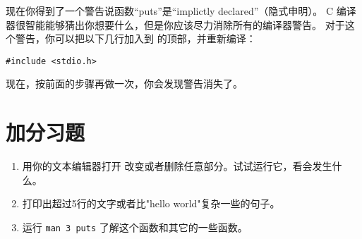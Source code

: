 现在你得到了一个警告说函数“puts”是“implictly declared”（隐式申明）。
C 编译器很智能能够猜出你想要什么，但是你应该尽力消除所有的编译器警告。
对于这个警告，你可以把以下几行加入到  的顶部，并重新编译：

\begin{lstlisting}
#include <stdio.h>
\end{lstlisting}

现在，按前面的步骤再做一次，你会发现警告消失了。

\section{加分习题}

\begin{enumerate}
\item 用你的文本编辑器打开  改变或者删除任意部分。试试运行它，看会发生什么。
\item 打印出超过5行的文字或者比"hello world"复杂一些的句子。
\item 运行 \verb|man 3 puts| 了解这个函数和其它的一些函数。
\end{enumerate}


